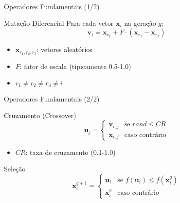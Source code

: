 \begin{frame}{Operadores Fundamentais (1/2)}
\begin{block}{Mutação Diferencial}
Para cada vetor $\mathbf{x}_i$ na geração $g$:
$$\mathbf{v}_i = \mathbf{x}_{r_1} + F \cdot (\mathbf{x}_{r_2} - \mathbf{x}_{r_3})$$
\end{block}

\begin{itemize}
    \item $\mathbf{x}_{r_1, r_2, r_3}$: vetores aleatórios
    \item $F$: fator de escala (tipicamente 0.5-1.0)
    \item $r_1 \neq r_2 \neq r_3 \neq i$
\end{itemize}
\end{frame}

\begin{frame}{Operadores Fundamentais (2/2)}
\begin{block}{Cruzamento (Crossover)}
$$\mathbf{u}_j = \begin{cases}
\mathbf{v}_{i,j} & \text{se } rand \leq CR \\
\mathbf{x}_{i,j} & \text{caso contrário}
\end{cases}$$
\begin{itemize}
    \item $CR$: taxa de cruzamento (0.1-1.0)
\end{itemize}
\end{block}

\begin{block}{Seleção}
$$\mathbf{x}_{i}^{g+1} = \begin{cases}
\mathbf{u}_i & \text{se } f(\mathbf{u}_i) \leq f(\mathbf{x}_i^g) \\
\mathbf{x}_i^g & \text{caso contrário}
\end{cases}$$
\end{block}
\end{frame}

